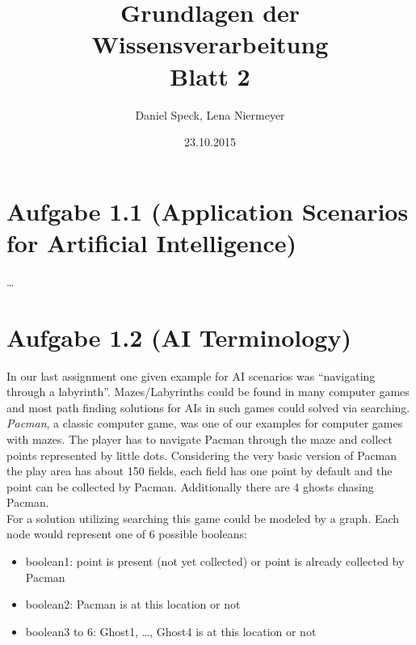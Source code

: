 \documentclass[10pt,a4paper]{article}
\title{\textbf{\huge Grundlagen der Wissensverarbeitung
\\\Large Blatt 2}}
\author{Daniel Speck, Lena Niermeyer}
\date{23.10.2015}
\begin{document}
	\maketitle




	\section*{Aufgabe 1.1 (Application Scenarios for Artificial Intelligence)}
	
		\dots
			
	
	
	
	\section*{Aufgabe 1.2 (AI Terminology)}

		In our last assignment one given example for AI scenarios was \enquote{navigating through a labyrinth}. Mazes/Labyrinths could be found in many computer games and most path finding solutions for AIs in such games could solved via searching.
		\\
		\textit{Pacman}, a classic computer game, was one of our examples for computer games with mazes. The player has to navigate Pacman through the maze and collect points represented by little dots. Considering the very basic version of Pacman the play area has about 150 fields, each field has one point by default and the point can be collected by Pacman. Additionally there are 4 ghosts chasing Pacman.
		\\
		For a solution utilizing searching this game could be modeled by a graph. Each node would represent one of 6 possible booleans:
		
		\begin{itemize}
			\item boolean1: point is present (not yet collected) or point is already collected by Pacman
			\item boolean2: Pacman is at this location or not
			\item boolean3 to 6: Ghost1, \dots, Ghost4 is at this location or not
		\end{itemize}
		
\end{document}
